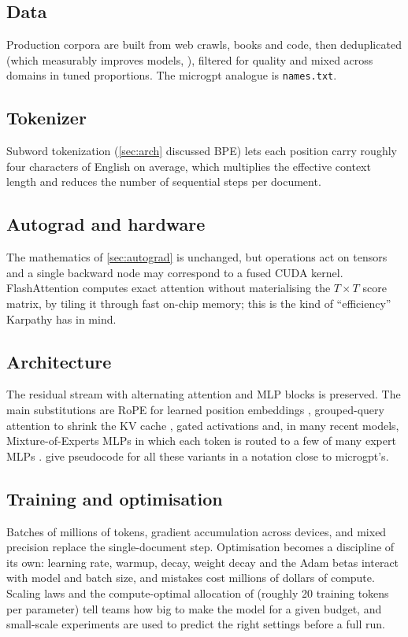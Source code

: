 \documentclass[11pt,letterpaper]{article}
\theoremstyle{remark}
\begin{document}
\subsection{Data}
Production corpora are built from web crawls, books and code, then deduplicated (which measurably improves models, \citeauthor{lee2022dedup} \citeyear{lee2022dedup}), filtered for quality and mixed across domains in tuned proportions. The microgpt analogue is \texttt{names.txt}.

\subsection{Tokenizer}
Subword tokenization (\cref{sec:arch} discussed BPE) lets each position carry roughly four characters of English on average, which multiplies the effective context length and reduces the number of sequential steps per document.

\subsection{Autograd and hardware}
The mathematics of \cref{sec:autograd} is unchanged, but operations act on tensors and a single backward node may correspond to a fused CUDA kernel. FlashAttention \parencite{dao2022flashattention} computes exact attention without materialising the $T\times T$ score matrix, by tiling it through fast on-chip memory; this is the kind of ``efficiency'' Karpathy has in mind.

\subsection{Architecture}
The residual stream with alternating attention and MLP blocks is preserved. The main substitutions are RoPE for learned position embeddings \parencite{su2021rope}, grouped-query attention to shrink the KV cache \parencite{ainslie2023gqa}, gated activations \parencite{shazeer2020glu} and, in many recent models, Mixture-of-Experts MLPs in which each token is routed to a few of many expert MLPs \parencite{shazeer2017moe,fedus2022switch,deepseek2024v3}. \textcite{phuong2022formal} give pseudocode for all these variants in a notation close to microgpt's.

\subsection{Training and optimisation}
Batches of millions of tokens, gradient accumulation across devices, and mixed precision \parencite{micikevicius2018mixed} replace the single-document step. Optimisation becomes a discipline of its own: learning rate, warmup, decay, weight decay and the Adam betas interact with model and batch size, and mistakes cost millions of dollars of compute. Scaling laws \parencite{kaplan2020scaling} and the compute-optimal allocation of \textcite{hoffmann2022chinchilla} (roughly 20 training tokens per parameter) tell teams how big to make the model for a given budget, and small-scale experiments are used to predict the right settings before a full run.
\end{document}
